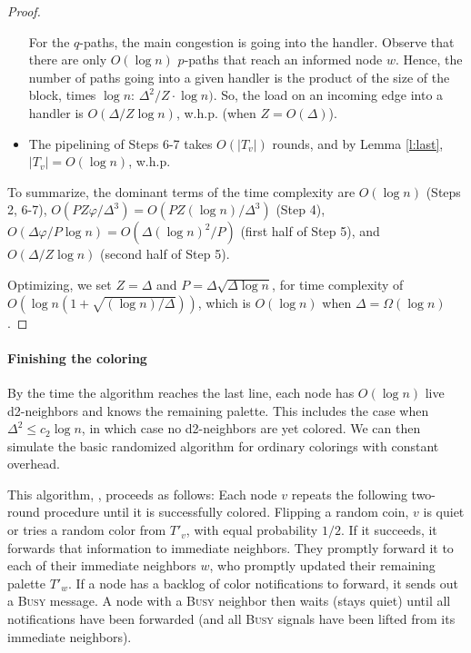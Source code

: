 \begin{proof}
\begin{itemize}
For the $q$-paths, the main congestion is going into the handler. Observe that there are only $O(\log n)$ $p$-paths that reach an informed node $w$. Hence, the number of paths going into a given handler is the product of the size of the block, times $\log n$: $\Delta^2/Z \cdot \log n)$. So, the load on an incoming edge into a handler is $O(\Delta/Z \log n)$, w.h.p. (when $Z = O(\Delta)$).

\item The pipelining of Steps 6-7 takes $O(|T_v|)$ rounds, and by Lemma \ref{l:last}, $|T_v| = O(\log n)$, w.h.p. 

\end{itemize}

To summarize, the dominant terms of the time complexity are $O(\log n)$ (Steps 2, 6-7), $O(PZ\varphi/\Delta^3) = O(PZ (\log n)/\Delta^3)$ (Step 4), $O(\Delta\varphi/P \log n) = O(\Delta(\log n)^2/P)$ (first half of Step 5), and $O(\Delta/Z \log n)$ (second half of Step 5).

Optimizing, we set $Z = \Delta$ and $P = \Delta \sqrt{\Delta\log n}$, 
for time complexity of $O(\log n (1 + \sqrt{(\log n)/\Delta}))$, which is $O(\log n)$ when $\Delta = \Omega(\log n)$. 
\end{proof}


\paragraph{Finishing the coloring}

By the time the algorithm reaches the last line, each node has $O(\log n)$ live d2-neighbors and knows the remaining palette. This includes the case when $\Delta^2 \le c_2\log n$, in which case no d2-neighbors are yet colored. 
We can then simulate the basic randomized algorithm for ordinary colorings with constant overhead. 

This algorithm, , proceeds as follows:
Each node $v$ repeats the following two-round procedure until it is successfully colored. 
Flipping a random coin, $v$ is quiet or tries a random color from $T'_v$, with equal probability $1/2$.
If it succeeds, it forwards that information to immediate neighbors. They promptly forward it to each of their immediate neighbors $w$, who promptly updated their remaining palette $T'_w$. If a node has a backlog of color notifications to forward, it sends out a \textsc{Busy} message. A node with a \textsc{Busy} neighbor then waits (stays quiet) until all notifications have been forwarded (and all \textsc{Busy} signals have been lifted from its immediate neighbors). 

